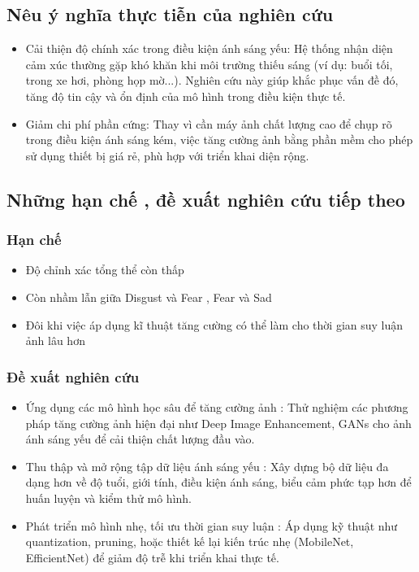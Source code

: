 \subsection{Nêu ý nghĩa thực tiễn của nghiên cứu}
\begin{itemize}
    \item Cải thiện độ chính xác trong điều kiện ánh sáng yếu: Hệ thống nhận diện cảm xúc thường gặp khó khăn khi môi trường thiếu sáng (ví dụ: buổi tối, trong xe hơi, phòng họp mờ...). Nghiên cứu này giúp khắc phục vấn đề đó, tăng độ tin cậy và ổn định của mô hình trong điều kiện thực tế.
    \item Giảm chi phí phần cứng: Thay vì cần máy ảnh chất lượng cao để chụp rõ trong điều kiện ánh sáng kém, việc tăng cường ảnh bằng phần mềm cho phép sử dụng thiết bị giá rẻ, phù hợp với triển khai diện rộng.
\end{itemize}

\subsection{Những hạn chế , đề xuất nghiên cứu tiếp theo}

\subsubsection{Hạn chế}
\begin{itemize}
    \item Độ chỉnh xác tổng thể còn thấp
    \item Còn nhầm lẫn giữa Disgust và Fear , Fear và Sad
    \item Đôi khi việc áp dụng kĩ thuật tăng cường có thể làm cho thời gian suy luận ảnh lâu hơn
\end{itemize}

\subsubsection{Đề xuất nghiên cứu}
\begin{itemize}
    \item Ứng dụng các mô hình học sâu để tăng cường ảnh : Thử nghiệm các phương pháp tăng cường ảnh hiện đại như Deep Image Enhancement, GANs cho ảnh ánh sáng yếu để cải thiện chất lượng đầu vào.
    \item Thu thập và mở rộng tập dữ liệu ánh sáng yếu : Xây dựng bộ dữ liệu đa dạng hơn về độ tuổi, giới tính, điều kiện ánh sáng, biểu cảm phức tạp hơn để huấn luyện và kiểm thử mô hình.
    \item Phát triển mô hình nhẹ, tối ưu thời gian suy luận : Áp dụng kỹ thuật như quantization, pruning, hoặc thiết kế lại kiến trúc nhẹ (MobileNet, EfficientNet) để giảm độ trễ khi triển khai thực tế.
\end{itemize}

